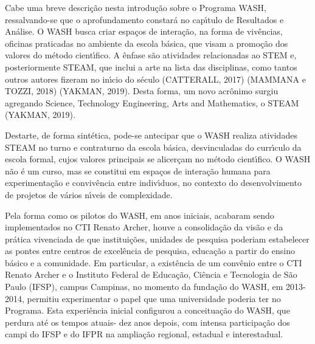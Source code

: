\documentclass[
12pt,		%
openright,	%
twoside,  %
a4paper,			%
chapter=TITLE,		%
english,			%
french,				%
spanish,			%
brazil				%
]{USPSC-classe/USPSC}
\begin{document}
Cabe uma breve descri\c{c}\~ao nesta introdu\c{c}\~ao sobre o Programa WASH, ressalvando-se que o aprofundamento constar\'a no cap\'{\i}tulo de Resultados e An\'alise. O WASH busca criar espa\c{c}os de intera\c{c}\~ao, na forma de  viv\^encias, oficinas praticadas no ambiente da escola b\'asica, que visam a promo\c{c}\~ao dos valores do m\'etodo cient\'{\i}fico. A \^enfase s\~ao atividades relacionadas ao STEM e, posteriormente STEAM, que inclui a arte na lista das disciplinas, como tantos outros autores fizeram no in\'{\i}cio do s\'eculo (CATTERALL, 2017) (MAMMANA e TOZZI, 2018)  (YAKMAN, 2019). Desta forma, um novo acr\^onimo surgiu agregando Science, Technology Engineering, Arts and Mathematics, o STEAM (YAKMAN, 2019).









Destarte, de forma sint\'etica, pode-se antecipar que o WASH realiza atividades STEAM no turno e contraturno da escola b\'asica, desvinculadas do curr\'{\i}culo da escola formal, cujos valores principais se alicer\c{c}am no m\'etodo cient\'{\i}fico. O WASH n\~ao \'e um curso, mas se constitui em espa\c{c}os de intera\c{c}\~ao humana para experimenta\c{c}\~ao e conviv\^encia entre indiv\'{\i}duos, no contexto do desenvolvimento de projetos de v\'arios n\'{\i}veis de complexidade.









Pela forma como os pilotos do WASH, em anos iniciais, acabaram sendo implementados no  CTI Renato Archer, houve a consolida\c{c}\~ao da vis\~ao e da pr\'atica vivenciada de que institui\c{c}\~oes, unidades de pesquisa poderiam estabelecer as pontes entre centros de excel\^encia de pesquisa, educa\c{c}\~ao a partir do ensino b\'asico e a comunidade. Em particular, a exist\^encia de um conv\^enio entre o CTI Renato Archer e o Instituto Federal de Educa\c{c}\~ao, Ci\^encia e Tecnologia de S\~ao Paulo (IFSP), campus Campinas, no momento da funda\c{c}\~ao do WASH, em 2013-2014, permitiu experimentar o papel que uma universidade poderia ter no Programa. Esta experi\^encia inicial configurou a conceitua\c{c}\~ao do WASH, que perdura at\'e os tempos atuais- dez anos depois, com intensa participa\c{c}\~ao dos campi do IFSP e do IFPR na amplia\c{c}\~ao regional, estadual e interestadual.
\end{document}
